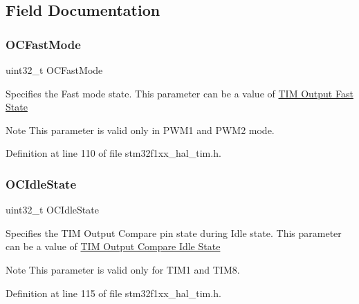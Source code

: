 \subsection{Field Documentation}
\mbox{\label{struct_t_i_m___o_c___init_type_def_aadc3d763f52920adcd0150ffbad1043a}} 
\subsubsection{\texorpdfstring{O\+C\+Fast\+Mode}{OCFastMode}}
{\footnotesize\ttfamily uint32\+\_\+t O\+C\+Fast\+Mode}

Specifies the Fast mode state. This parameter can be a value of \hyperlink{group___t_i_m___output___fast___state}{T\+IM Output Fast State} \begin{DoxyNote}{Note}
This parameter is valid only in P\+W\+M1 and P\+W\+M2 mode. 
\end{DoxyNote}


Definition at line 110 of file stm32f1xx\+\_\+hal\+\_\+tim.\+h.

\mbox{\label{struct_t_i_m___o_c___init_type_def_a57bb589da3cf2b39b727fe4a3d334ab3}} 
\subsubsection{\texorpdfstring{O\+C\+Idle\+State}{OCIdleState}}
{\footnotesize\ttfamily uint32\+\_\+t O\+C\+Idle\+State}

Specifies the T\+IM Output Compare pin state during Idle state. This parameter can be a value of \hyperlink{group___t_i_m___output___compare___idle___state}{T\+IM Output Compare Idle State} \begin{DoxyNote}{Note}
This parameter is valid only for T\+I\+M1 and T\+I\+M8. 
\end{DoxyNote}


Definition at line 115 of file stm32f1xx\+\_\+hal\+\_\+tim.\+h.

